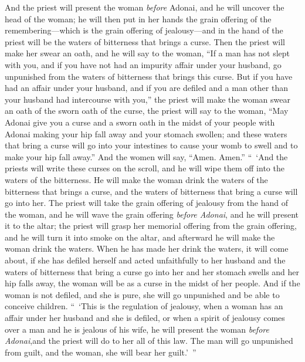\begin{biblechapter}
\verse And the priest will present the woman \textit{before} Adonai, and he will uncover the head of the woman; he will then put in her hands the grain offering of the remembering—which is the grain offering of jealousy—and in the hand of the priest will be the waters of bitterness that brings a curse.
\verse Then the priest will make her swear an oath, and he will say to the woman, “If a man has not slept with you, and if you have not had an impurity affair under your husband, go unpunished from the waters of bitterness that brings this curse.
\verse But if you have had an affair under your husband, and if you are defiled and a man other than your husband had intercourse with you,”
\verse the priest will make the woman swear an oath of the sworn oath of the curse, the priest will say to the woman, “May Adonai give you a curse and a sworn oath in the midst of your people with Adonai making your hip fall away and your stomach swollen;
\verse and these waters that bring a curse will go into your intestines to cause your womb to swell and to make your hip fall away.” And the women will say, “Amen. Amen.”
\verse “ ‘And the priests will write these curses on the scroll, and he will wipe them off into the waters of the bitterness.
\verse He will make the woman drink the waters of the bitterness that brings a curse, and the waters of bitterness that bring a curse will go into her.
\verse The priest will take the grain offering of jealousy from the hand of the woman, and he will wave the grain offering \textit{before Adonai}, and he will present it to the altar;
\verse the priest will grasp her memorial offering from the grain offering, and he will turn it into smoke on the altar, and afterward he will make the woman drink the waters.
\verse When he has made her drink the waters, it will come about, if she has defiled herself and acted unfaithfully to her husband and the waters of bitterness that bring a curse go into her and her stomach swells and her hip falls away, the woman will be as a curse in the midst of her people.
\verse And if the woman is not defiled, and she is pure, she will go unpunished and be able to conceive children.
\verse “ ‘This is the regulation of jealousy, when a woman has an affair under her husband and she is defiled,
\verse or when a spirit of jealousy comes over a man and he is jealous of his wife, he will present the woman \textit{before Adonai},and the priest will do to her all of this law.
\verse The man will go unpunished from guilt, and the woman, she will bear her guilt.’ ”
\end{biblechapter}

